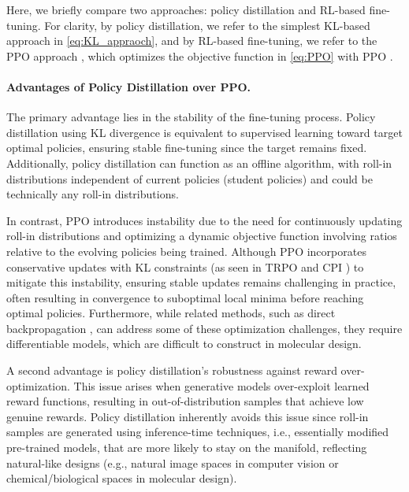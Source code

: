 Here, we briefly compare two approaches: policy distillation and RL-based fine-tuning. For clarity, by policy distillation, we refer to the simplest KL-based approach in \eqref{eq:KL_appraoch}, and by RL-based fine-tuning, we refer to the PPO approach \citep{black2023training,fan2023dpok}, which optimizes the objective function in \eqref{eq:PPO} with PPO \citep{schulman2017proximal}.


\paragraph{Advantages of Policy Distillation over PPO.} 

The primary advantage lies in the stability of the fine-tuning process. Policy distillation using KL divergence is equivalent to supervised learning toward target optimal policies, ensuring stable fine-tuning since the target remains fixed. {Additionally, policy distillation can function as an offline algorithm, with roll-in distributions independent of current policies (student policies) and could be technically any roll-in distributions.} 



In contrast, PPO introduces instability due to the need for continuously updating roll-in distributions and optimizing a dynamic objective function involving ratios relative to the evolving policies being trained. Although PPO incorporates conservative updates with KL constraints (as seen in TRPO \citep{schulman2015trust} and CPI \citep{kakade2002approximately}) to mitigate this instability, ensuring stable updates remains challenging in practice, often resulting in convergence to suboptimal local minima before reaching optimal policies. Furthermore, while related methods, such as direct backpropagation \citep{clark2023directly,prabhudesai2023aligning}, can address some of these optimization challenges, they require differentiable models, which are difficult to construct in molecular design.

A second advantage is policy distillation’s robustness against reward over-optimization. This issue arises when generative models over-exploit learned reward functions, resulting in out-of-distribution samples that achieve low genuine rewards. Policy distillation inherently avoids this issue since roll-in samples are generated using inference-time techniques, i.e., essentially modified pre-trained models, that are more likely to stay on the manifold, reflecting natural-like designs (e.g., natural image spaces in computer vision or chemical/biological spaces in molecular design).

